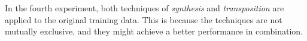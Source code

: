
In the fourth experiment, both techniques of
\emph{synthesis} and \emph{transposition} are applied to the
original training data. This is because the techniques are
not mutually exclusive, and they might achieve a better
performance in combination.


